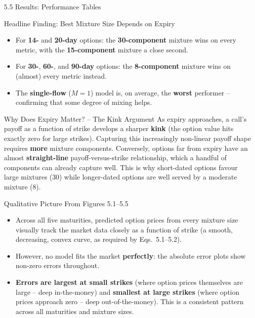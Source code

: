 \documentclass[aspectratio=169,10pt]{beamer}
\begin{document}
\begin{frame}[allowframebreaks]{5.5 Results: Performance Tables}
\framebreak

\begin{block}{Headline Finding: Best Mixture Size Depends on Expiry}
\begin{itemize}
  \item For \textbf{14-} and \textbf{20-day} options: the \textbf{30-component}
  mixture wins on every metric, with the \textbf{15-component} mixture a
  close second.
  \item For \textbf{30-}, \textbf{60-}, and \textbf{90-day} options: the
  \textbf{8-component} mixture wins on (almost) every metric instead.
  \item The \textbf{single-flow} ($M=1$) model is, on average, the
  \textbf{worst} performer -- confirming that some degree of mixing helps.
\end{itemize}
\end{block}

\begin{block}{Why Does Expiry Matter? -- The Kink Argument}
As expiry approaches, a call's payoff as a function of strike develops a
sharper \textbf{kink} (the option value hits exactly zero for large
strikes). Capturing this increasingly non-linear payoff shape requires
\textbf{more} mixture components. Conversely, options far from expiry have
an almost \textbf{straight-line} payoff-versus-strike relationship, which a
handful of components can already capture well. This is why short-dated
options favour large mixtures (30) while longer-dated options are well
served by a moderate mixture (8).
\end{block}

\framebreak

\begin{block}{Qualitative Picture From Figures 5.1--5.5}
\begin{itemize}
  \item Across all five maturities, predicted option prices from every
  mixture size visually track the market data closely as a function of
  strike (a smooth, decreasing, convex curve, as required by
  Eqs.~5.1--5.2).
  \item However, no model fits the market \textbf{perfectly}: the absolute
  error plots show non-zero errors throughout.
  \item \textbf{Errors are largest at small strikes} (where option prices
  themselves are large -- deep in-the-money) and \textbf{smallest at large
  strikes} (where option prices approach zero -- deep out-of-the-money).
  This is a consistent pattern across all maturities and mixture sizes.
\end{itemize}
\end{block}


\end{frame}
\end{document}
